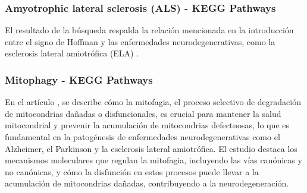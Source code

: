 \subsubsection{Amyotrophic lateral sclerosis (ALS) - KEGG Pathways}

El resultado de la búsqueda respalda la relación mencionada en la introducción entre el signo de Hoffman y las enfermedades neurodegenerativas, como la esclerosis lateral amiotrófica (ELA) \cite{RIANCHO201927}.

\subsubsection{Mitophagy - KEGG Pathways}

En el artículo \cite{Zhang2022}, se describe cómo la mitofagia, el proceso selectivo de degradación de mitocondrias dañadas o disfuncionales, es crucial para mantener la salud mitocondrial y prevenir la acumulación de mitocondrias defectuosas, lo que es fundamental en la patogénesis de enfermedades neurodegenerativas como el Alzheimer, el Parkinson y la esclerosis lateral amiotrófica. El estudio destaca los mecanismos moleculares que regulan la mitofagia, incluyendo las vías canónicas y no canónicas, y cómo la disfunción en estos procesos puede llevar a la acumulación de mitocondrias dañadas, contribuyendo a la neurodegeneración.